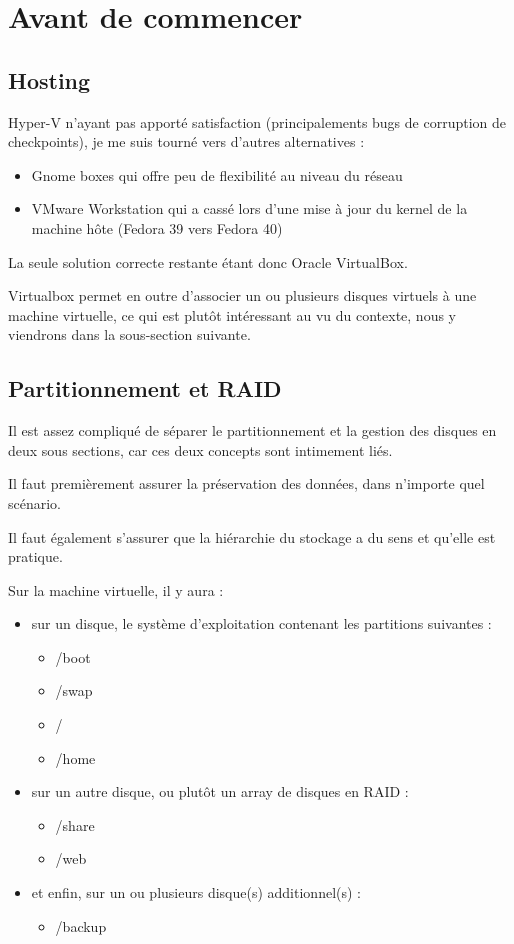\documentclass{article}
\begin{document}
\pagebreak

\section{Avant de commencer}
	
\subsection{Hosting}
	
Hyper-V n'ayant pas apporté satisfaction (principalements bugs de corruption de checkpoints), je me suis tourné vers d'autres alternatives :
\begin{itemize}
\item Gnome boxes qui offre peu de flexibilité au niveau du réseau
\item VMware Workstation qui a cassé lors d'une mise à jour du kernel de la machine hôte (Fedora 39 vers Fedora 40)
\end{itemize}
La seule solution correcte restante étant donc Oracle VirtualBox.
	
Virtualbox permet en outre d'associer un ou plusieurs disques virtuels à une machine virtuelle, ce qui est plutôt intéressant au vu du contexte, nous y viendrons dans la sous-section suivante.	
	
\subsection{Partitionnement et RAID}

Il est assez compliqué de séparer le partitionnement et la gestion des disques en deux sous sections, car ces deux concepts sont intimement liés.

Il faut premièrement assurer la préservation des données, dans n'importe quel scénario. 

Il faut également s'assurer que la hiérarchie du stockage a du sens et qu'elle est pratique. 

Sur la machine virtuelle, il y aura :

\begin{itemize}
\item sur un disque, le système d'exploitation contenant les partitions suivantes :
\begin{itemize}
\item /boot
\item /swap
\item /
\item /home
\end{itemize}
\item sur un autre disque, ou plutôt un array de disques en RAID :
\begin{itemize}
\item /share
\item /web
\end{itemize}
\item et enfin, sur un ou plusieurs disque(s) additionnel(s) :
\begin{itemize}
\item /backup
\end{itemize}
\end{itemize}
	
\end{document}
